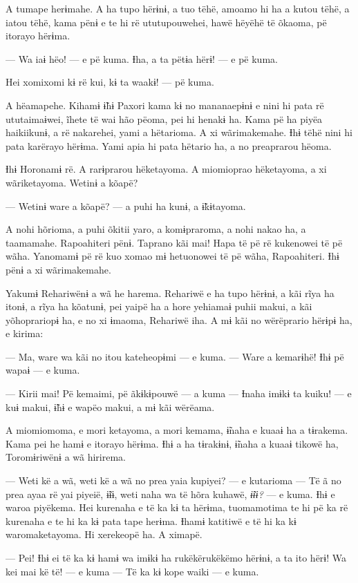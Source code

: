 A tumape herɨmahe. A ha tupo hërɨnɨ, a tuo tëhë, amoamo hi ha a kutou
tëhë, a iatou tëhë, kama pënɨ e te hi rë ututupouwehei, hawë hëyëhë të
õkaoma, pë itorayo hërɨma. 

--- Wa iaɨ hëo! --- e pë kuma. Ɨha, a ta pëtɨa hërɨ! --- e pë kuma. 

Hei xomixomi kɨ rë kui, kɨ ta waakɨ! --- pë kuma. 

A hëamapehe. Kihamɨ ɨ̃hɨ Paxori kama kɨ no mananaepɨnɨ e nini hi pata rë
ututaimaɨwei, ĩhete të wai hão pëoma, pei hi henakɨ ha. Kama pë ha piyëa
haikiikunɨ, a rë nakarehei, yami a hëtarioma. A xi wãrimakemahe. Ɨhɨ
tëhë nini hi pata karërayo hërɨma. Yami apia hi pata hëtario ha, a no
preaprarou hëoma. 

Ɨhɨ Horonamɨ rë. A rarɨprarou hëketayoma. A miomioprao hëketayoma, a xi
wãriketayoma. Wetinɨ a kõapë? 

--- Wetinɨ ware a kõapë? --- a puhi ha kunɨ, a ɨ̃kɨtayoma. 

A nohi hõrioma, a puhi õkitii yaro, a komɨpraroma, a nohi nakao ha, a
 taamamahe. Rapoahiteri pënɨ. Taprano kãi mai! Hapa të pë rë kukenowei të
 pë wãha. Yanomamɨ pë rë kuo xomao mɨ hetuonowei të pë wãha, Rapoahiteri.
 Ɨhɨ pënɨ a xi wãrimakemahe. 

Yakumɨ Rehariwënɨ a wã he harema. Rehariwë e ha tupo hërɨnɨ, a kãi rĩya
ha itonɨ, a rĩya ha kõatunɨ, pei yaipë ha a hore yehiamaɨ puhii makui, a
kãi yõhoprariopɨ ha, e no xi ɨmaoma, Rehariwë iha. A mɨ kãi no
wërëprario hërɨpɨ ha, e kirima:

--- Ma, ware wa kãi no itou kateheopɨmi --- e kuma. --- Ware a kemarɨhë!
Ɨhɨ pë wapaɨ --- e kuma. 

--- Kirii mai! Pë kemaimi, pë ãkɨkɨpouwë --- a kuma --- Ɨnaha imɨkɨ ta
 kuiku! --- e kuɨ makui, ɨ̃hɨ e wapëo makui, a mɨ kãi wërëama.

A miomiomoma, e mori ketayoma, a mori kemama, ɨ̃naha e kuaaɨ ha a
 tɨrakema. Kama pei he hamɨ e itorayo hërɨma. Ɨhɨ a ha tɨrakɨnɨ, ɨ̃naha a
 kuaaɨ tikowë ha, Toromɨriwënɨ a wã hirirema. 

--- Weti kë a wã, weti kë a wã no prea yaia kupiyei? --- e kutarioma --- Të
ã no prea ayaa rë yai piyeië, ɨ̃ɨɨ, weti naha wa të hõra kuhawë, \textit{ɨ̃ɨɨ?} ---
e kuma. Ɨhɨ e waroa piyëkema. Hei kurenaha e të ka kɨ ta hërɨma,
tuomamotima te hi pë ka rë kurenaha e te hi ka kɨ pata tape herɨma.
Ɨhamɨ katitiwë e të hi ka kɨ waromaketayoma. Hi xerekeopë ha. A ximapë. 

--- Pei! Ɨhɨ ei të ka kɨ hamɨ wa imɨkɨ ha rukëkërukëkëmo hërɨnɨ, a ta ito
 hërɨ! Wa kei mai kë të! --- e kuma --- Të ka kɨ kope waiki --- e kuma.

